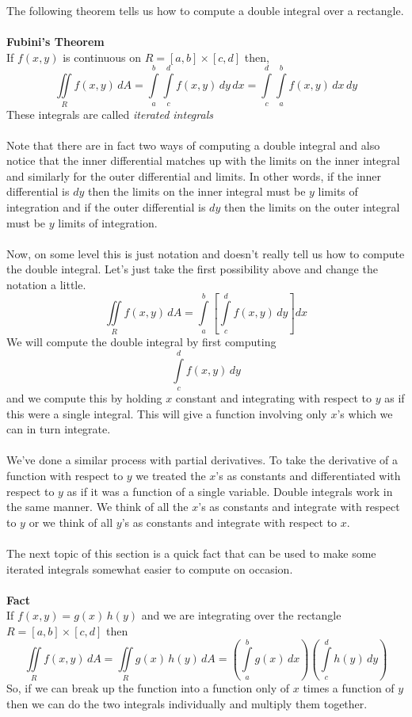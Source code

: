 \documentclass[10pt,reqno]{book}
\theoremstyle{definition}
\begin{document}
	The following theorem tells us how to compute a double integral over a rectangle.\\ \\
	\textbf{Fubini's Theorem}\\
	If $ f(x,y) $ is continuous on $ R = [a,b] \times [c,d] $ then,
	\[ \iint\limits_R f(x,y)\,dA = \int\limits_a^b \int\limits_c^d f(x,y)\,dy\,dx = \int\limits_c^d \int\limits_a^b f(x,y)\,dx\,dy \]
	These integrals are called \textit{iterated integrals}\\ \\
	Note that there are in fact two ways of computing a double integral and also notice that the inner differential matches up with the limits on the inner integral and similarly for the outer differential and limits.  In other words, if the inner differential is $ dy $ then the limits on the inner integral must be $ y $ limits of integration and if the outer differential is $ dy $ then the limits on the outer integral must be $ y $ limits of integration.\\ \\
	Now, on some level this is just notation and doesn't really tell us how to compute the double integral. Let's just take the first possibility above and change the notation a little.
	\[ \iint\limits_R f(x,y)\,dA = \int\limits_a^b \left[ \int\limits_c^d f(x,y)\,dy \right] dx  \]
	We will compute the double integral by first computing 
	\[ \int\limits_c^d f(x,y)\,dy \]
	and we compute this by holding $ x $ constant and integrating with respect to $ y $ as if this were a single integral. This will give a function involving only $ x $'s which we can in turn integrate.\\ \\
	We've done a similar process with partial derivatives. To take the derivative of a function with respect to $ y $ we treated the $ x $'s as constants and differentiated with respect to $ y $ as if it was a function of a single variable. Double integrals work in the same manner. We think of all the $ x $'s as constants and integrate with respect to $ y $ or we think of all $ y $'s as constants and integrate with respect to $ x $.\\ \\
	The next topic of this section is a quick fact that can be used to make some iterated integrals somewhat easier to compute on occasion.\\ \\
	\textbf{Fact}\\
	If $ f(x,y) = g(x)\,h(y) $ and we are integrating over the rectangle $ R = [a,b] \times [c,d] $ then
	\[ \iint\limits_R f(x,y)\,dA = \iint\limits_R g(x)\,h(y)\,dA = \left( \int\limits_a^b g(x)\,dx \right) \left( \int\limits_c^d h(y)\,dy \right) \] 
	So, if we can break up the function into a function only of $ x $ times a function of $ y $ then we can do the two integrals individually and multiply them together.
	
\end{document}
